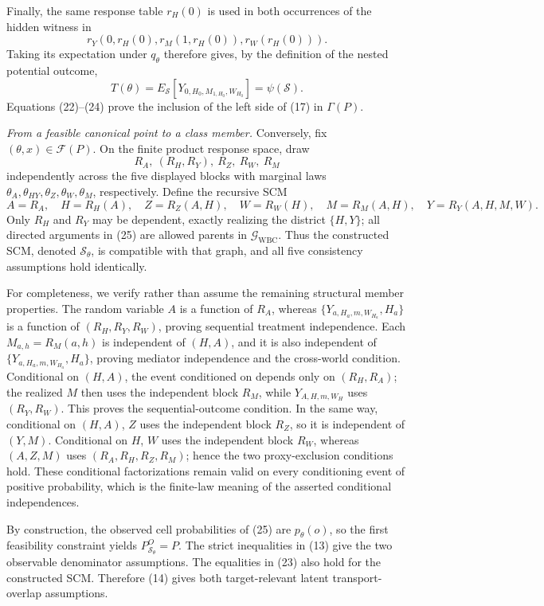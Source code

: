 Finally, the same response table \(r_H(0)\) is used in both occurrences of
the hidden witness in
\[
 r_Y\!\left(0,r_H(0),r_M(1,r_H(0)),r_W(r_H(0))\right).
\]
Taking its expectation under \(q_\theta\) therefore gives, by the definition
of the nested potential outcome,
\[
 T(\theta)=E_{\mathcal S}
 [Y_{0,H_0,M_{1,H_0},W_{H_0}}]=\psi(\mathcal S).
 \tag{24}
\]
Equations (22)--(24) prove the inclusion of the left side of (17) in
\(\Gamma(P)\).

\emph{From a feasible canonical point to a class member.}
Conversely, fix \((\theta,x)\in\mathcal F(P)\).  On the finite product
response space, draw
\[
 R_A,\ (R_H,R_Y),\ R_Z,\ R_W,\ R_M
\]
independently across the five displayed blocks with marginal laws
\(\theta_A,\theta_{HY},\theta_Z,\theta_W,\theta_M\), respectively.  Define
the recursive SCM
\[
 A=R_A,\quad H=R_H(A),\quad Z=R_Z(A,H),\quad W=R_W(H),\quad
 M=R_M(A,H),\quad Y=R_Y(A,H,M,W).
 \tag{25}
\]
Only \(R_H\) and \(R_Y\) may be dependent, exactly realizing the district
\(\{H,Y\}\); all directed arguments in (25) are allowed parents in
\(\mathcal G_{\mathrm{WBC}}\).  Thus the constructed SCM, denoted
\(\mathcal S_\theta\), is compatible with that graph, and all five
consistency assumptions hold identically.

For completeness, we verify rather than assume the remaining structural
member properties.  The random variable \(A\) is a function of \(R_A\),
whereas \(\{Y_{a,H_a,m,W_{H_a}},H_a\}\) is a function of
\((R_H,R_Y,R_W)\), proving sequential treatment independence.  Each
\(M_{a,h}=R_M(a,h)\) is independent of \((H,A)\), and it is also independent
of \(\{Y_{a,H_a,m,W_{H_a}},H_a\}\), proving mediator independence and the
cross-world condition.  Conditional on \((H,A)\), the event conditioned on
depends only on \((R_H,R_A)\); the realized \(M\) then uses the independent
block \(R_M\), while \(Y_{A,H,m,W_H}\) uses \((R_Y,R_W)\).  This proves
the sequential-outcome condition.  In the same way, conditional on
\((H,A)\), \(Z\) uses the independent block \(R_Z\), so it is independent
of \((Y,M)\).  Conditional on \(H\), \(W\) uses the independent block
\(R_W\), whereas \((A,Z,M)\) uses \((R_A,R_H,R_Z,R_M)\); hence the two
proxy-exclusion conditions hold.  These conditional factorizations remain
valid on every conditioning event of positive probability, which is the
finite-law meaning of the asserted conditional independences.

By construction, the observed cell probabilities of (25) are
\(p_\theta(o)\), so the first feasibility constraint yields
\(P_{\mathcal S_\theta}^O=P\).  The strict inequalities in (13) give the two
observable denominator assumptions.  The equalities in (23) also hold for
the constructed SCM.  Therefore (14) gives both target-relevant latent
transport-overlap assumptions.

